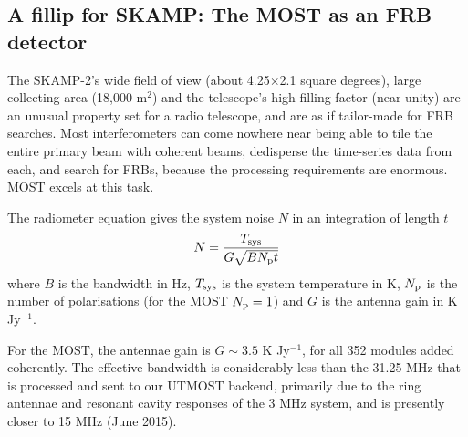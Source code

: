 \subsection{A fillip for SKAMP: The MOST as an FRB detector}

The SKAMP-2's wide field of view (about 4.25$\times$2.1 square degrees), large collecting area (18,000 m$^2$) and the telescope's high filling factor (near unity) are an unusual property set for a radio telescope, and are as if tailor-made for FRB searches. Most interferometers can come nowhere near being able to tile the entire primary beam with coherent beams, dedisperse the time-series data from each, and search for FRBs, because the processing requirements are enormous. MOST excels at this task.  

The radiometer equation gives the system noise $N$ in an integration of length $t$ 
\begin{equation}
N={{T_{\rm sys}}\over{G\sqrt{BN_{\rm p}t}}}
\end{equation}
\noindent where $B$ is the bandwidth in Hz, $T_{\rm sys}$ is the system temperature in K, $N_{\rm p}$ is the number of polarisations (for the MOST $N_{\rm p}=1$) and $G$ is the antenna gain in K Jy$^{-1}$. 

For the MOST, the antennae gain is $G\sim 3.5$ K Jy$^{-1}$, for all 352 modules added coherently. The effective bandwidth is considerably less than the 31.25 MHz that is processed and sent to our UTMOST backend, primarily due to the ring antennae and resonant cavity responses of the 3 MHz system, and is presently closer to 15 MHz (June 2015). 

